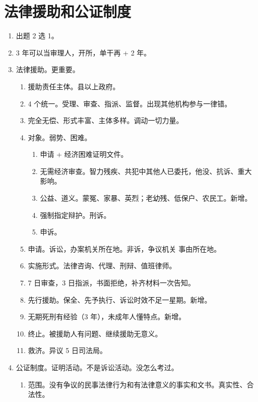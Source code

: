 \section{法律援助和公证制度}
\begin{enumerate}
  \item 出题 2 选 1。
  \item 3 年可以当审理人，开所，单干再 + 2 年。
  \item 法律援助。更重要。
        \begin{enumerate}
          \item 援助责任主体。县以上政府。
          \item 4 个统一。受理、审查、指派、监督。出现其他机构参与一律错。
          \item 完全无偿、形式丰富、主体多样。调动一切力量。
          \item 对象。弱势、困难。
                \begin{enumerate}
                  \item 申请 + 经济困难证明文件。
                  \item 无需经济审查。智力残疾、共犯中其他人已委托，他没、抗诉、重大影响。
                  \item 公益、道义。蒙冤、家暴、英烈；老幼残、低保户、农民工。新增。
                  \item 强制指定辩护。刑诉。
                  \item 申诉。
                \end{enumerate}
          \item 申请。诉讼，办案机关所在地。非诉，争议机关 \hz 事由所在地。
          \item 实施形式。法律咨询、代理、刑辩、值班律师。
          \item 7 日审查，3 日指派，书面拒绝，补齐材料一次告知。
          \item 先行援助。保全、先予执行、诉讼时效不足一星期。新增。
          \item 无期死刑有经验（3 年），未成年人懂特点。新增。
          \item 终止。被援助人有问题、继续援助无意义。
          \item 救济。异议 5 日司法局。
        \end{enumerate}
  \item 公证制度。证明活动。不是诉讼活动。没怎么考过。
        \begin{enumerate}
          \item 范围。没有争议的民事法律行为和有法律意义的事实和文书。真实性、合法性。

\end{enumerate}
\end{enumerate}
